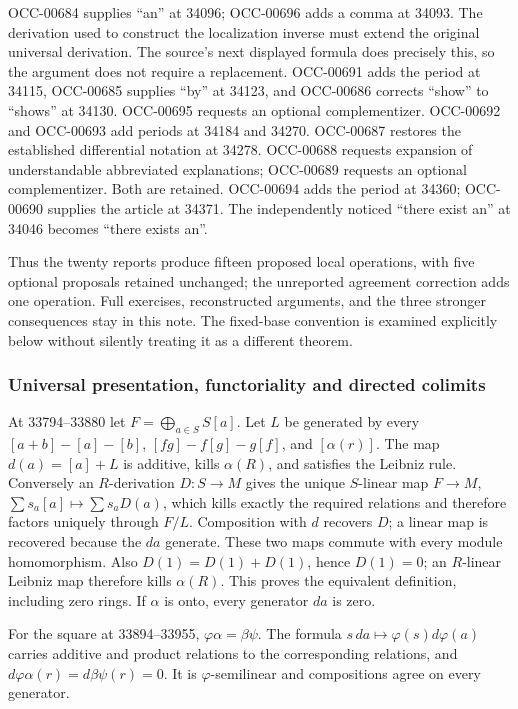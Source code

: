 OCC-00684 supplies ``an'' at 34096; OCC-00696 adds a comma at 34093. The derivation used to construct the localization inverse must extend the original universal derivation. The source's next displayed formula does precisely this, so the argument does not require a replacement. OCC-00691 adds the period at 34115, OCC-00685 supplies ``by'' at 34123, and OCC-00686 corrects ``show'' to ``shows'' at 34130. OCC-00695 requests an optional complementizer. OCC-00692 and OCC-00693 add periods at 34184 and 34270. OCC-00687 restores the established differential notation at 34278. OCC-00688 requests expansion of understandable abbreviated explanations; OCC-00689 requests an optional complementizer. Both are retained. OCC-00694 adds the period at 34360; OCC-00690 supplies the article at 34371. The independently noticed ``there exist an'' at 34046 becomes ``there exists an''.

Thus the twenty reports produce fifteen proposed local operations, with five optional proposals retained unchanged; the unreported agreement correction adds one operation. Full exercises, reconstructed arguments, and the three stronger consequences stay in this note. The fixed-base convention is examined explicitly below without silently treating it as a different theorem.

\subsubsection{Universal presentation, functoriality and directed colimits}\label{algebra-proof-041-universal-presentation-functoriality-and-directed-colimits}

At 33794--33880 let \(F=\bigoplus_{a\in S}S[a]\). Let \(L\) be generated by every \([a+b]-[a]-[b]\), \([fg]-f[g]-g[f]\), and \([\alpha(r)]\). The map \(d(a)=[a]+L\) is additive, kills \(\alpha(R)\), and satisfies the Leibniz rule. Conversely an \(R\)-derivation \(D:S\to M\) gives the unique \(S\)-linear map \(F\to M\), \(\sum s_a[a]\mapsto\sum s_aD(a)\), which kills exactly the required relations and therefore factors uniquely through \(F/L\). Composition with \(d\) recovers \(D\); a linear map is recovered because the \(da\) generate. These two maps commute with every module homomorphism. Also \(D(1)=D(1)+D(1)\), hence \(D(1)=0\); an \(R\)-linear Leibniz map therefore kills \(\alpha(R)\). This proves the equivalent definition, including zero rings. If \(\alpha\) is onto, every generator \(da\) is zero.

For the square at 33894--33955, \(\varphi\alpha=\beta\psi\). The formula \(s\,da\mapsto\varphi(s)d\varphi(a)\) carries additive and product relations to the corresponding relations, and \(d\varphi\alpha(r)=d\beta\psi(r)=0\). It is \(\varphi\)-semilinear and compositions agree on every generator.

